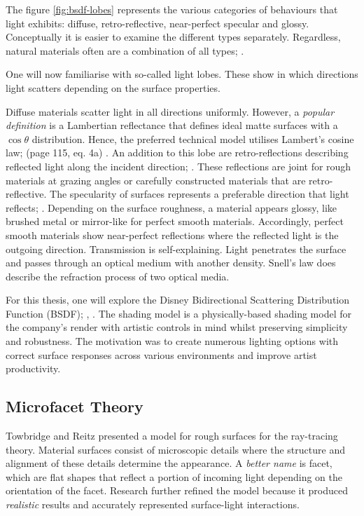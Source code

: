 The figure \ref{fig:bsdf-lobes} represents the various categories of behaviours that light exhibits: diffuse, retro-reflective, near-perfect specular and glossy.
Conceptually it is easier to examine the different types separately.
Regardless, natural materials often are a combination of all types; \cite{cook_reflectance_1982}.

One will now familiarise with so-called light lobes.
These show in which directions light scatters depending on the surface properties.

Diffuse materials scatter light in all directions uniformly.
However, a \textit{popular definition} is a Lambertian reflectance that defines ideal matte surfaces with a $\cos\theta$ distribution.
Hence, the preferred technical model utilises Lambert's cosine law; (page 115, eq. 4a) \cite{lambert_lamberts_1892}.
An addition to this lobe are retro-reflections describing reflected light along the incident direction; \cite{berns_event_2021}.
These reflections are joint for rough materials at grazing angles or carefully constructed materials that are retro-reflective.
The specularity of surfaces represents a preferable direction that light reflects; \cite{pharr_physically_2017}.
Depending on the surface roughness, a material appears glossy, like brushed metal or mirror-like for perfect smooth materials.
Accordingly, perfect smooth materials show near-perfect reflections where the reflected light is the outgoing direction.
Transmission is self-explaining.
Light penetrates the surface and passes through an optical medium with another density.
Snell's law does describe the refraction process of two optical media.

For this thesis, one will explore the Disney Bidirectional Scattering Distribution Function (BSDF); \cite{burley_physically_2012}, \cite{burley_extending_2015}.
The shading model is a physically-based shading model for the company's render with artistic controls in mind whilst preserving simplicity and robustness.
The motivation was to create numerous lighting options with correct surface responses across various environments and improve artist productivity.

\subsection{Microfacet Theory}

Towbridge and Reitz \cite{trowbridge_average_1975} presented a model for rough surfaces for the ray-tracing theory.
Material surfaces consist of microscopic details where the structure and alignment of these details determine the appearance.
A \textit{better name} is facet, which are flat shapes that reflect a portion of incoming light depending on the orientation of the facet.
Research further refined the model because it produced \textit{realistic} results and accurately represented surface-light interactions.

